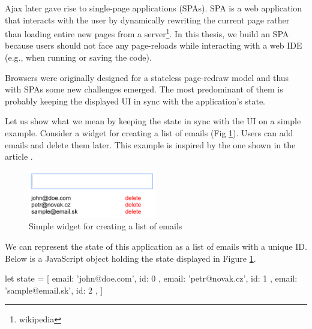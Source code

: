 Ajax later gave rise to single-page applications (SPAs). SPA is a web application that interacts with the user by dynamically rewriting
the current page rather than loading entire new pages from a server\footnote{wikipedia}. In this thesis, we build an SPA because users should not
face any page-reloads while interacting with a web IDE (e.g., when running or saving the code).  

Browsers were originally designed for a stateless page-redraw model and thus with SPAs some new challenges emerged. The most predominant of them is
probably keeping the displayed UI in sync with the application's state.

Let us show what we mean by keeping the state in sync with the UI on a simple example. Consider a widget for creating a list of emails (Fig \ref{fig:chap2:emails}).
Users can add emails and delete them later. This example is inspired by the one shown in the article \cite{JSFramework}.
\begin{figure}[!hbt]
    \centering
	\includegraphics[width=0.5\textwidth]{../img/emails}
	\caption{Simple widget for creating a list of emails}
	\label{fig:chap2:emails}
\end{figure}

We can represent the state of this application as a list of emails with a unique ID. Below is a JavaScript object holding the state displayed in
Figure \ref{fig:chap2:emails}.
\begin{code}
let state = [
    { email: 'john@doe.com', id: 0 },
    { email: 'petr@novak.cz', id: 1 },
    { email: 'sample@email.sk', id: 2 },
]
\end{code}

